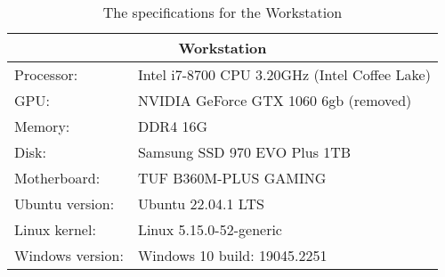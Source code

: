 \begin{table}[H]
    \begin{tabular}{ll}
    \hline
    \multicolumn{2}{|c|}{Workstation}           \\ \hline
    Processor:   & Intel i7-8700 CPU 3.20GHz (Intel Coffee Lake)\\
    GPU:         & NVIDIA GeForce GTX 1060 6gb (removed) \\
    Memory:      & DDR4 16G                     \\
    Disk:        & Samsung SSD 970 EVO Plus 1TB \\
    Motherboard: & TUF B360M-PLUS GAMING       \\
    Ubuntu version:  & Ubuntu 22.04.1 LTS        \\
    Linux kernel: & Linux 5.15.0-52-generic       \\
    Windows version:& Windows 10 build: 19045.2251
    \end{tabular}
    \caption{The specifications for the Workstation}
    \label{tab:komplett}
\end{table}